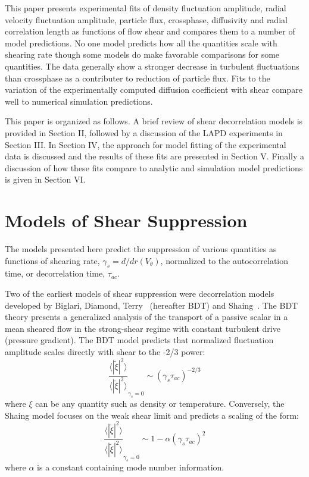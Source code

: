 \documentclass[aip,pop,amsmath,amssymb,peprint,superscriptaddress]{revtex4-1} %
\begin{document}
This paper presents experimental fits of density fluctuation
amplitude, radial velocity fluctuation amplitude, particle flux,
crossphase, diffusivity and radial correlation length as functions of
flow shear and compares them to a number of model predictions. No one
model predicts how all the quantities scale with shearing rate though
some models do make favorable comparisons for some quantities.  The
data generally show a stronger decrease in turbulent fluctuations than
crossphase as a contributer to reduction of particle flux.  Fits to
the variation of the experimentally computed diffusion coefficient
with shear compare well to numerical simulation predictions. 

This paper is organized as follows.  A brief review of shear decorrelation models is provided in Section II, followed by a discussion of the LAPD experiments in Section III. In Section IV, the approach for model fitting of the experimental data is discussed and the results of these fits are presented in Section V. Finally a discussion of how these fits compare to analytic and simulation model predictions is given in Section VI.

\section{Models of Shear Suppression}

The models presented here predict the suppression of various quantities as functions of shearing rate, $\gamma_{s} = d/dr(V_{\theta})$, normalized to the autocorrelation time, or decorrelation time, $\tau_{ac}$.

Two of the earliest models of shear suppression were decorrelation models developed by Biglari, Diamond, Terry~\cite{biglari90} (hereafter BDT) and Shaing~\cite{shaing90}. The BDT theory presents a generalized analysis of the transport of a passive scalar in a mean sheared flow in the strong-shear regime with constant turbulent drive (pressure gradient). The BDT model predicts that normalized fluctuation amplitude scales directly with shear to the -2/3 power:
%
\begin{equation}
\frac{\langle |\tilde{\xi}|^{2} \rangle}{\langle |\tilde{\xi}|^{2} \rangle}_{\gamma_{s}=0} \sim (\gamma_{s}\tau_{ac})^{-2/3}
\label{eq:BDT_theory}
\end{equation}
%
where $\xi$ can be any quantity such as density or temperature. Conversely, the Shaing model focuses on the weak shear limit and predicts a scaling of the form:
%
\begin{equation}
\frac{\langle |\tilde{\xi}|^{2} \rangle}{\langle |\tilde{\xi}|^{2} \rangle}_{\gamma_{s}=0} \sim 1- \alpha(\gamma_{s}\tau_{ac})^2
\label{eq:shaing_theory}
\end{equation}
%
where $\alpha$ is a constant containing mode number information. 
\end{document}
